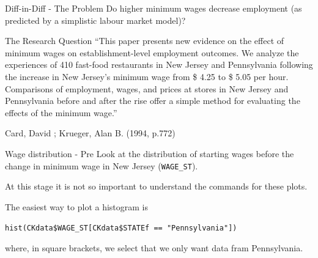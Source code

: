 \documentclass[
  ignorenonframetext,
]{beamer}
\newenvironment{Shaded}{\begin{snugshade}}{\end{snugshade}}
\newcommand{\FunctionTok}[1]{\textcolor[rgb]{0.13,0.29,0.53}{\textbf{#1}}}
\newcommand{\NormalTok}[1]{#1}
\newcommand{\SpecialCharTok}[1]{\textcolor[rgb]{0.81,0.36,0.00}{\textbf{#1}}}
\newcommand{\StringTok}[1]{\textcolor[rgb]{0.31,0.60,0.02}{#1}}
\begin{document}
\begin{frame}{Diff-in-Diff - The Problem}
\label{diff-in-diff---the-problem}
Do higher minimum wages decrease employment (as predicted by a
simplistic labour market model)?
\end{frame}

\begin{frame}{The Research Question}
\label{the-research-question-1}
``This paper presents new evidence on the effect of minimum wages on
establishment-level employment outcomes. We analyze the experiences of
410 fast-food restaurants in New Jersey and Pennsylvania following the
increase in New Jersey's minimum wage from \$ 4.25 to \$ 5.05 per hour.
Comparisons of employment, wages, and prices at stores in New Jersey and
Pennsylvania before and after the rise offer a simple method for
evaluating the effects of the minimum wage.''

Card, David ; Krueger, Alan B. (1994, p.772)
\end{frame}

\begin{frame}[fragile]{Wage distribution - Pre}
\label{wage-distribution---pre}
Look at the distribution of starting wages before the change in minimum
wage in New Jersey (\texttt{WAGE\_ST}).

At this stage it is not so important to understand the commands for
these plots.

The easiest way to plot a histogram is

\texttt{hist(CKdata\$WAGE\_ST{[}CKdata\$STATEf\ ==\ "Pennsylvania"{]})}

where, in square brackets, we select that we only want data fram
Pennsylvania.

\footnotesize

\begin{Shaded}
\end{Shaded}

\normalsize
\end{frame}
\end{document}
